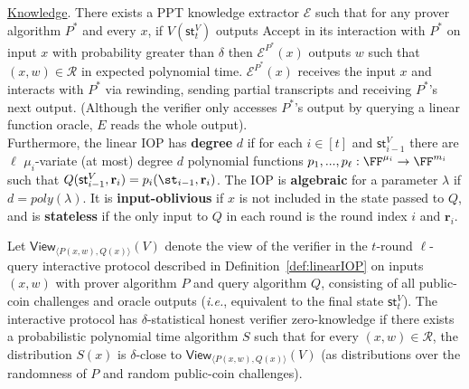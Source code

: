 \begin{definition} 
\noindent \underline{Knowledge}. There exists a PPT knowledge extractor $\mathcal{E}$ such that for any prover algorithm $P^*$ and every $x$, if $V(\textsf{st}^V_t)$ outputs \textsf{Accept} in its interaction with $P^*$ on input $x$ with probability greater than $\delta$ then $\mathcal{E}^{P^*}(x)$ outputs $w$ such that $(x, w) \in \mathcal{R}$ in expected polynomial time. $\mathcal{E}^{P^*}(x)$ receives the input $x$ and interacts with $P^*$ via rewinding, sending partial transcripts and receiving $P^*$'s next output. (Although the verifier only accesses $P^*$'s output by querying a linear function oracle, $E$ reads the whole output).  \\

Furthermore, the linear IOP has \textbf{degree} $d$ if for each $i \in [t]$ and $\textsf{st}^V_{i-1}$ there are $\ell$ $\mu_i$-variate (at most) degree $d$ polynomial functions $p_1,...,p_\ell: \FF^{\mu_i} \rightarrow \FF^{m_i}$ such that $Q(\textsf{st}^V_{i-1}, \mathbf{r}_i) = p_i(\st_{i-1}, \mathbf{r}_i)$. The IOP is \textbf{algebraic} for a parameter $\lambda$ if $d = poly(\lambda)$.
It is \textbf{input-oblivious} if $x$ is not included in the state passed to $Q$, and is \textbf{stateless} if the only input to $Q$ in each round is the round index $i$ and $\mathbf{r}_i$.


\end{definition} 


\begin{definition}
Let $\textsf{View}_{\langle P(x, w), Q(x) \rangle}(V)$ denote the view of the verifier in the $t$-round $\ell$-query interactive protocol described in Definition~\ref{def:linearIOP} on inputs $(x,w)$ with prover algorithm $P$ and query algorithm $Q$, consisting of all public-coin challenges and oracle outputs (\emph{i.e.}, equivalent to the final state $\textsf{st}^V_t$). The interactive protocol has $\delta$-statistical honest verifier zero-knowledge if there exists a probabilistic polynomial time algorithm $S$ such that for every $(x, w) \in \mathcal{R}$, the distribution $S(x)$ is $\delta$-close to $\textsf{View}_{\langle P(x, w), Q(x) \rangle}(V)$ (as distributions over the randomness of $P$ and random public-coin challenges).
\end{definition}

